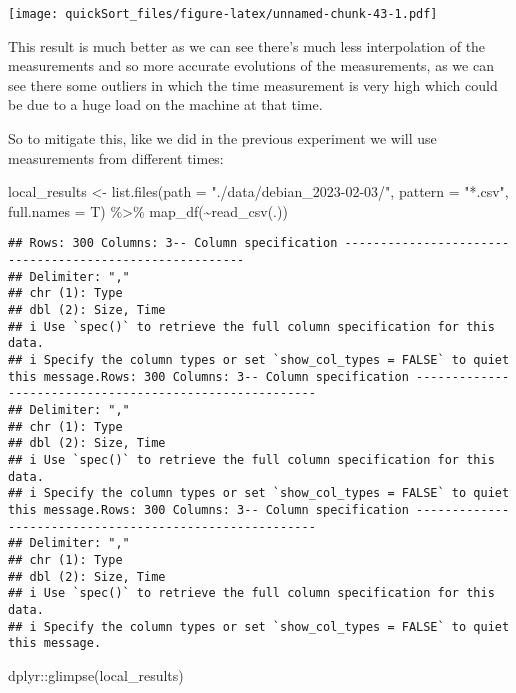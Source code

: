 \documentclass[
]{article}
\newenvironment{Shaded}{\begin{snugshade}}{\end{snugshade}}
\newcommand{\AttributeTok}[1]{\textcolor[rgb]{0.77,0.63,0.00}{#1}}
\newcommand{\FunctionTok}[1]{\textcolor[rgb]{0.00,0.00,0.00}{#1}}
\newcommand{\NormalTok}[1]{#1}
\newcommand{\OtherTok}[1]{\textcolor[rgb]{0.56,0.35,0.01}{#1}}
\newcommand{\SpecialCharTok}[1]{\textcolor[rgb]{0.00,0.00,0.00}{#1}}
\newcommand{\StringTok}[1]{\textcolor[rgb]{0.31,0.60,0.02}{#1}}
\begin{document}
\texttt{[image: quickSort\_files/figure-latex/unnamed-chunk-43-1.pdf]}

This result is much better as we can see there's much less interpolation
of the measurements and so more accurate evolutions of the measurements,
as we can see there some outliers in which the time measurement is very
high which could be due to a huge load on the machine at that time.

So to mitigate this, like we did in the previous experiment we will use
measurements from different times:

\begin{Shaded}
\begin{Highlighting}[]
\NormalTok{local\_results }\OtherTok{\textless{}{-}} \FunctionTok{list.files}\NormalTok{(}\AttributeTok{path =} \StringTok{"./data/debian\_2023{-}02{-}03/"}\NormalTok{, }\AttributeTok{pattern =} \StringTok{"*.csv"}\NormalTok{, }\AttributeTok{full.names =}\NormalTok{ T) }\SpecialCharTok{\%\textgreater{}\%} \FunctionTok{map\_df}\NormalTok{(}\SpecialCharTok{\textasciitilde{}}\FunctionTok{read\_csv}\NormalTok{(.)) }
\end{Highlighting}
\end{Shaded}

\begin{verbatim}
## Rows: 300 Columns: 3-- Column specification --------------------------------------------------------
## Delimiter: ","
## chr (1): Type
## dbl (2): Size, Time
## i Use `spec()` to retrieve the full column specification for this data.
## i Specify the column types or set `show_col_types = FALSE` to quiet this message.Rows: 300 Columns: 3-- Column specification --------------------------------------------------------
## Delimiter: ","
## chr (1): Type
## dbl (2): Size, Time
## i Use `spec()` to retrieve the full column specification for this data.
## i Specify the column types or set `show_col_types = FALSE` to quiet this message.Rows: 300 Columns: 3-- Column specification --------------------------------------------------------
## Delimiter: ","
## chr (1): Type
## dbl (2): Size, Time
## i Use `spec()` to retrieve the full column specification for this data.
## i Specify the column types or set `show_col_types = FALSE` to quiet this message.
\end{verbatim}

\begin{Shaded}
\begin{Highlighting}[]
\NormalTok{dplyr}\SpecialCharTok{::}\FunctionTok{glimpse}\NormalTok{(local\_results)}
\end{Highlighting}
\end{Shaded}
\end{document}
